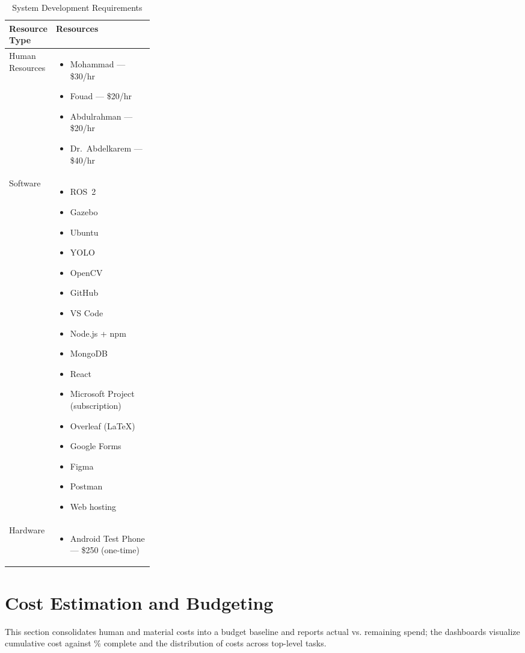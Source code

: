 \documentclass[12pt,a4paper]{report}
\begin{document}
\begin{table}[h!]
\centering
\begin{tabularx}{\linewidth}{|>{\raggedright\arraybackslash}p{0.28\linewidth}|>{\raggedright\arraybackslash}X|}
\hline
\textbf{Resource Type} & \textbf{Resources} \\
\hline
Human Resources &
\begin{itemize}[leftmargin=*]   
  \item Mohammad — \$30/hr
  \item Fouad — \$20/hr
  \item Abdulrahman — \$20/hr
  \item Dr.\ Abdelkarem — \$40/hr
\end{itemize}\\
\hline
Software &
\begin{itemize}[leftmargin=*]
  \item ROS~2
  \item Gazebo
  \item Ubuntu
  \item YOLO
  \item OpenCV
  \item GitHub
  \item VS Code
  \item Node.js + npm
  \item MongoDB
  \item React
  \item Microsoft Project (subscription)
  \item Overleaf (LaTeX)
  \item Google Forms
  \item Figma
  \item Postman
  \item Web hosting
\end{itemize}\\
\hline
Hardware &
\begin{itemize}[leftmargin=*]
  \item Android Test Phone — \$250 (one-time)
\end{itemize}\\
\hline
\end{tabularx}
\caption{System Development Requirements}
\end{table}


\section{Cost Estimation and Budgeting}
\noindent
This section consolidates human and material costs into a budget baseline and reports actual vs. remaining spend; the dashboards visualize cumulative cost against \% complete and the distribution of costs across top-level tasks.
\end{document}

